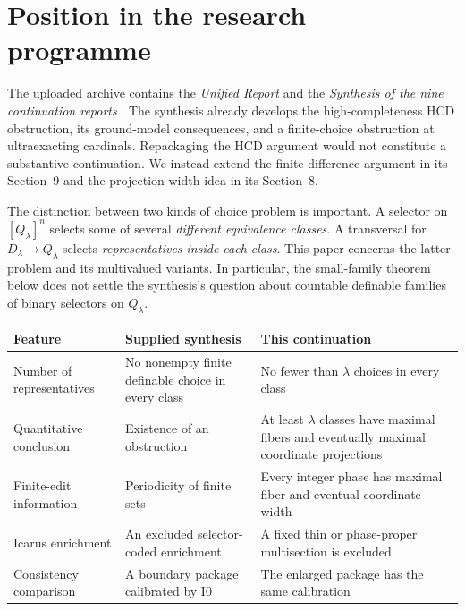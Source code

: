 \documentclass[11pt,letterpaper]{article}
\theoremstyle{definition}
\newcommand{\HCD}{\mathrm{HCD}}
\newcommand{\Izero}{\mathrm{I0}}
\numberwithin{equation}{section}
\begin{document}
\newpage
\tableofcontents

\newpage
\section{Position in the research programme}\label{sec:position}

The uploaded archive contains the \emph{Unified Report} and the \emph{Synthesis of the nine continuation reports} \cite{plan,synthesis}. The synthesis already develops the high-completeness $\HCD$ obstruction, its ground-model consequences, and a finite-choice obstruction at ultraexacting cardinals. Repackaging the $\HCD$ argument would not constitute a substantive continuation. We instead extend the finite-difference argument in its Section~9 and the projection-width idea in its Section~8.

The distinction between two kinds of choice problem is important. A selector on $[Q_\lambda]^n$ selects some of several \emph{different equivalence classes}. A transversal for $D_\lambda\to Q_\lambda$ selects \emph{representatives inside each class}. This paper concerns the latter problem and its multivalued variants. In particular, the small-family theorem below does not settle the synthesis's question about countable definable families of binary selectors on $Q_\lambda$.

\begin{center}
\small
\renewcommand{\arraystretch}{1.2}
\begin{tabularx}{\textwidth}{@{}P{.29\textwidth}YY@{}}
\toprule
\textbf{Feature}&\textbf{Supplied synthesis}&\textbf{This continuation}\\\midrule
Number of representatives&No nonempty finite definable choice in every class&No fewer than $\lambda$ choices in every class\\
Quantitative conclusion&Existence of an obstruction&At least $\lambda$ classes have maximal fibers and eventually maximal coordinate projections\\
Finite-edit information&Periodicity of finite sets&Every integer phase has maximal fiber and eventual coordinate width\\
Icarus enrichment&An excluded selector-coded enrichment&A fixed thin or phase-proper multisection is excluded\\
Consistency comparison&A boundary package calibrated by $\Izero$&The enlarged package has the same calibration\\
\bottomrule
\end{tabularx}
\end{center}
\end{document}

